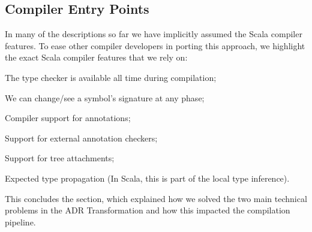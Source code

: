 


\subsection{Compiler Entry Points}
\label{sec:ildl:scala}

In many of the descriptions so far we have implicitly assumed the Scala compiler features. To ease other compiler developers in porting this approach, we highlight the exact Scala compiler features that we rely on:
%
\begin{compactitem}
  \item The type checker is available all time during compilation;
  \item We can change/see a symbol's signature at any phase;
  \item Compiler support for annotations;
  \item Support for external annotation checkers;
  \item Support for tree attachments;
  \item Expected type propagation (In Scala, this is part of the local type inference).
\end{compactitem}

This concludes the section, which explained how we solved the two main technical problems in the ADR Transformation and how this impacted the compilation pipeline.
